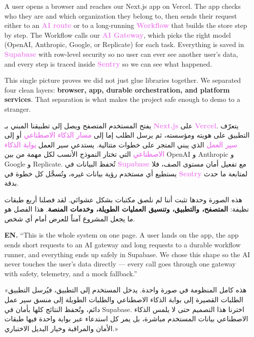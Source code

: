 \documentclass[11pt,a4paper]{article}
\DeclareRobustCommand{\ar}[1]{\RL{\arabicfont #1}}
\newenvironment{arblock}{\par\setRL\arabicfont\RaggedLeft}{\par}
\newcommand{\bilingual}[2]{%
  \noindent
  \begin{minipage}[t]{0.49\textwidth}
    \vspace{0pt}
    #1
  \end{minipage}\hfill
  \begin{minipage}[t]{0.49\textwidth}
    \vspace{0pt}
    \begin{arblock}#2\end{arblock}
  \end{minipage}\par\vspace{6pt}
}
\newcommand{\kw}[1]{\textcolor{Violet}{\textbf{#1}}}
\begin{document}
\bilingual{
\begin{enbox}
A user opens a browser and reaches our Next.js app on Vercel. The app checks who they are and which organization they belong to, then sends their request either to an \kw{AI route} or to a long-running \kw{Workflow} that builds the store step by step. The Workflow calls our \kw{AI Gateway}, which picks the right model (OpenAI, Anthropic, Google, or Replicate) for each task. Everything is saved in \kw{Supabase} with row-level security so no user can ever see another user's data, and every step is traced inside \kw{Sentry} so we can see what happened.
\end{enbox}
\begin{enbox}[Why this matters]
This single picture proves we did not just glue libraries together. We separated four clean layers: \textbf{browser, app, durable orchestration, and platform services}. That separation is what makes the project safe enough to demo to a stranger.
\end{enbox}
}{
\begin{arbox}[\ar{القصة في فقرة واحدة}]
يفتح المستخدم المتصفح ويصل إلى تطبيقنا المبني بـ \kw{Next.js} على \kw{Vercel}. يتعرّف التطبيق على هويته ومؤسسته، ثم يرسل الطلب إما إلى \kw{مسار الذكاء الاصطناعي} أو إلى \kw{سير العمل} الذي يبني المتجر على خطوات متتالية. يستدعي سير العمل \kw{بوابة الذكاء الاصطناعي} التي تختار النموذج الأنسب لكل مهمة من بين OpenAI و Anthropic و Google و Replicate. تُحفظ البيانات في \kw{Supabase} مع تفعيل أمان مستوى الصف، فلا يستطيع أي مستخدم رؤية بيانات غيره، وتُسجَّل كل خطوة في \kw{Sentry} لمتابعة ما حدث بدقة.
\end{arbox}
\begin{arbox}[\ar{لماذا هذا مهم}]
هذه الصورة وحدها تثبت أننا لم نلصق مكتبات بشكل عشوائي. لقد فصلنا أربع طبقات نظيفة: \textbf{المتصفح، والتطبيق، وتنسيق العمليات الطويلة، وخدمات المنصة}. هذا الفصل هو ما يجعل المشروع آمناً للعرض أمام أي شخص.
\end{arbox}
}

\begin{pitchbox}
\bilingual{
\textbf{EN.} ``This is the whole system on one page. A user lands on the app, the app sends short requests to an AI gateway and long requests to a durable workflow runner, and everything ends up safely in Supabase. We chose this shape so the AI never touches the user's data directly --- every call goes through one gateway with safety, telemetry, and a mock fallback.''
}{
\textbf{\ar{ع.}} «هذه كامل المنظومة في صورة واحدة. يدخل المستخدم إلى التطبيق، فيُرسل التطبيق الطلبات القصيرة إلى بوابة الذكاء الاصطناعي والطلبات الطويلة إلى منسق سير عمل دائم، وتُحفظ النتائج كلها بأمان في Supabase. اخترنا هذا التصميم حتى لا يلمس الذكاء الاصطناعي بيانات المستخدم مباشرة، بل يمر كل استدعاء عبر بوابة واحدة فيها طبقات الأمان والمراقبة وخيار البديل الاختباري.»
}
\end{pitchbox}
\end{document}
